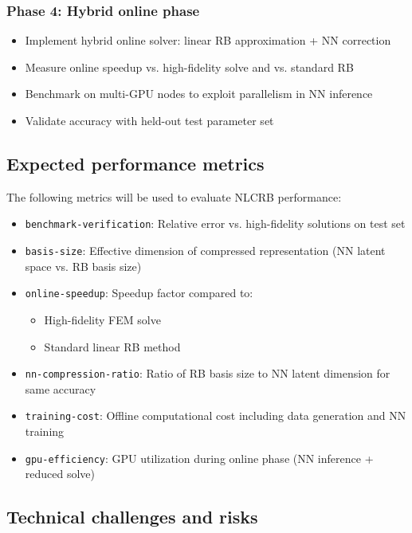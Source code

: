 \subsubsection{Phase 4: Hybrid online phase}
\begin{itemize}
\item Implement hybrid online solver: linear RB approximation + NN correction
\item Measure online speedup vs. high-fidelity solve and vs. standard RB
\item Benchmark on multi-GPU nodes to exploit parallelism in NN inference
\item Validate accuracy with held-out test parameter set
\end{itemize}



\subsection{Expected performance metrics}

The following metrics will be used to evaluate NLCRB performance:

\begin{itemize}
\item \texttt{benchmark-verification}: Relative error vs. high-fidelity solutions on test set
\item \texttt{basis-size}: Effective dimension of compressed representation (NN latent space vs. RB basis size)
\item \texttt{online-speedup}: Speedup factor compared to:
  \begin{itemize}
  \item High-fidelity FEM solve
  \item Standard linear RB method
  \end{itemize}
\item \texttt{nn-compression-ratio}: Ratio of RB basis size to NN latent dimension for same accuracy
\item \texttt{training-cost}: Offline computational cost including data generation and NN training
\item \texttt{gpu-efficiency}: GPU utilization during online phase (NN inference + reduced solve)
\end{itemize}



\subsection{Technical challenges and risks}

